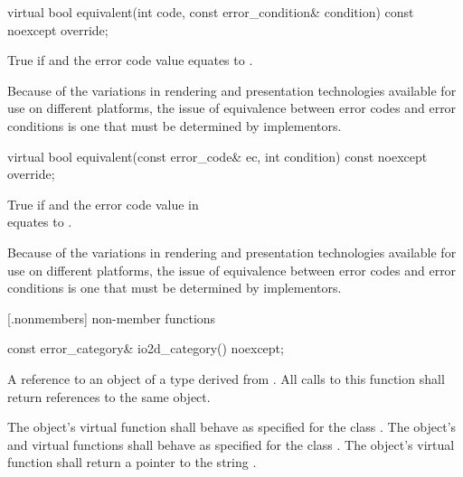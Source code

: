 \begin{itemdecl}
virtual bool equivalent(int code,
  const error_condition& condition) const noexcept override;
\end{itemdecl}
\begin{itemdescr}
	\pnum
	\returns
	True if  and the  error code value  equates to .
	\begin{note}
	Because of the variations in rendering and presentation technologies 
	available for use on different platforms, the issue of equivalence between 
	error codes and error conditions is one that must be determined by 
	implementors.
	\end{note}
\end{itemdescr}
\begin{itemdecl}
virtual bool equivalent(const error_code& ec,
  int condition) const noexcept override;
\end{itemdecl}
\begin{itemdescr}
	\pnum
	\returns
	True if  and the  error code value in\\  equates to .
	\begin{note}
	Because of the variations in rendering and presentation technologies 
	available for use on different platforms, the issue of equivalence between 
	error codes and error conditions is one that must be determined by 
	implementors.
	\end{note}
\end{itemdescr}

 [\iotwoderrorcategory.nonmembers] { 
non-member functions}

\begin{itemdecl}
  const error_category& io2d_category() noexcept;
\end{itemdecl}
\begin{itemdescr}
	\pnum
	\returns
	A reference to an object of a type derived from . All 
	calls to this function shall return references to the same object.
	
	\pnum
	\remarks
	The object's  virtual function shall behave 
	as specified for the class . The object's 
	 and  
	virtual functions shall behave as specified for the class 
	. The object's  virtual function 
	shall return a pointer to the string .
\end{itemdescr}

